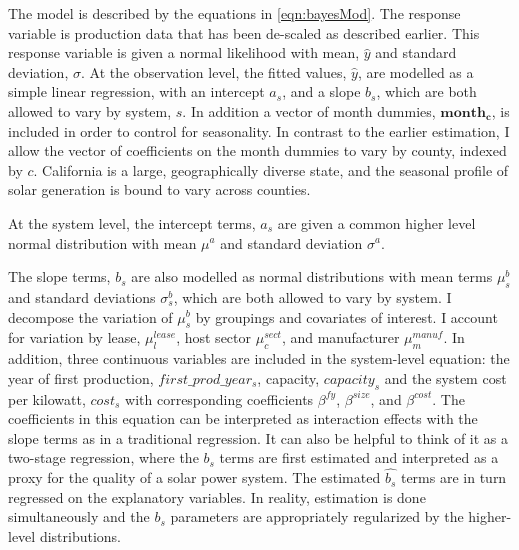\documentclass[a4paper]{article}
\begin{document}
The model is described by the equations in \ref{eqn:bayesMod}. The response variable is production data that has been de-scaled as described earlier. This response variable is given a normal likelihood with mean, $\hat{y}$ and standard deviation, $\sigma$. At the observation level, the fitted values, $\hat{y}$, are modelled as a simple linear regression, with an intercept $a_s$, and a slope $b_s$, which are both allowed to vary by system, $s$. In addition a vector of month dummies, $\mathbf{month_c}$, is included in order to control for seasonality. In contrast to the earlier estimation, I allow the vector of coefficients on the month dummies to vary by county, indexed by $c$. California is a large, geographically diverse state, and the seasonal profile of solar generation is bound to vary across counties.

At the system level, the intercept terms, $a_s$ are given a common higher level normal distribution with mean $\mu^a$ and standard deviation $\sigma^a$.

The slope terms, $b_s$ are also modelled as normal distributions with mean terms $\mu^{b}_s$ and standard deviations $\sigma^{b}_s$, which are both allowed to vary by system. I decompose the variation of $\mu^{b}_s$ by groupings and covariates of interest. I account for variation by lease, $\mu^{lease}_l$, host sector $\mu^{sect}_c$, and manufacturer $\mu^{manuf}_m$. In addition, three continuous variables are included in the system-level equation: the year of first production, $first\_prod\_year_s$, capacity, $capacity_s$ and the system cost per kilowatt, $cost_s$ with corresponding coefficients $\beta^{fy}$, $\beta^{size}$, and $\beta^{cost}$. The coefficients in this equation can be interpreted as interaction effects with the slope terms as in a traditional regression. It can also be helpful to think of it as a two-stage regression, where the $b_s$ terms are first estimated and interpreted as a proxy for the quality of a solar power system. The estimated $\hat{b_s}$ terms are in turn regressed on the explanatory variables. In reality, estimation is done simultaneously and the $b_s$ parameters are appropriately regularized by the higher-level distributions.
\end{document}
